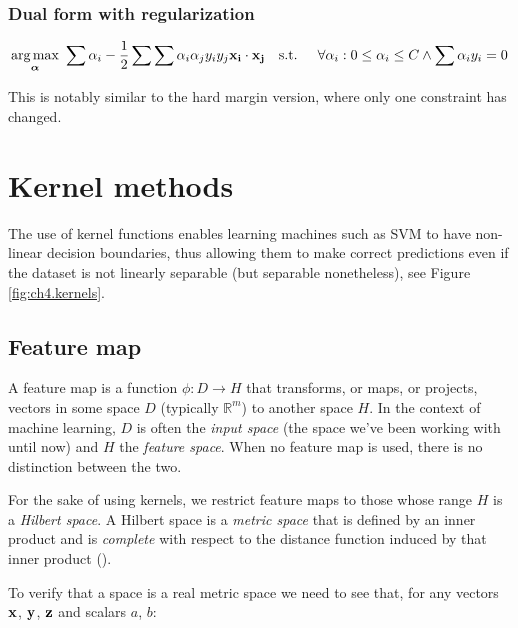 \subsubsection*{Dual form with regularization}
\begin{align}\label{eq:svm_dual_reg} 
    \underset{\boldsymbol{\alpha}}{\text{arg} \max}\ \sum \alpha_i - \frac{1}{2} \sum \sum \alpha_i \alpha_j y_i y_j \mathbf{x_i} \cdot \mathbf{x_j}
    \text{\quad s.t. \quad} \forall \alpha_i : 0 \le \alpha_i \le C \land \sum \alpha_i y_i = 0
\end{align}

This is notably similar to the hard margin version, where only one constraint has changed. 

\pagebreak

\section{Kernel methods}
\label{sec:ch4.kernels}

The use of kernel functions enables learning machines such as SVM to have non-linear decision boundaries, thus allowing them to make correct predictions even if the dataset is not linearly separable (but separable nonetheless), see Figure \ref{fig:ch4.kernels}.

\subsection{Feature map}

A feature map is a function $\phi : D \rightarrow H$ that transforms, or maps, or projects, vectors in some space $D$ (typically $\mathbb{R}^m$) to another space $H$. In the context of machine learning, $D$ is often the \emph{input space} (the space we've been working with until now) and $H$ the \emph{feature space}. When no feature map is used, there is no distinction between the two.

For the sake of using kernels, we restrict feature maps to those whose range $H$ is a \emph{Hilbert space}. A Hilbert space is a \emph{metric space} that is defined by an inner product and is \emph{complete} with respect to the distance function induced by that inner product (\cite{noauthor_wikipedia_2021-1}).

To verify that a space is a real metric space we need to see that, for any vectors $\mathbf{x}$, $\mathbf{y}$, $\mathbf{z}$ and scalars $a$, $b$:

